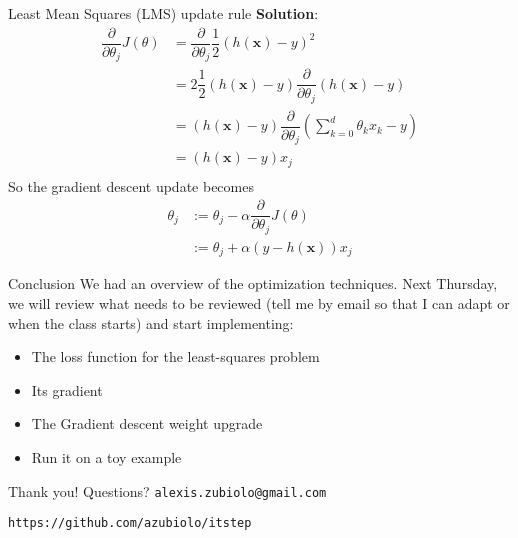 \documentclass{beamer}
\newcommand{\bx}{\bm{x}}
\newcommand{\1}[1]{\mathbbm{1}\left[#1\right]}
\begin{document}
\begin{frame}{Least Mean Squares (LMS) update rule}
\textbf{Solution}: 
\begin{equation*}
\begin{split}
\dfrac{\partial}{\partial \theta_j} J(\theta) & = \dfrac{\partial}{\partial \theta_j} \dfrac{1}{2} \left( h\left(\bx\right) - y \right)^2 \\ 
 & = 2 \dfrac{1}{2} \left( h\left(\bx\right) - y \right) \dfrac{\partial}{\partial \theta_j}\left( h\left(\bx\right) - y \right)\\
 & = \left( h\left(\bx\right) - y \right) \dfrac{\partial}{\partial \theta_j}\left( \sum_{k = 0}^{d} \theta_k x_k - y \right)\\
 & = \left( h\left(\bx\right) - y \right) x_j\\
\end{split}
\end{equation*}
\pause
\vfill
So the gradient descent update becomes
\begin{equation*}
\begin{split}
\theta_j &:= \theta_j - \alpha \dfrac{\partial}{\partial \theta_j} J(\theta) \\
 & := \theta_j + \alpha \left( y - h\left(\bx\right)\right) x_j
\end{split}
\end{equation*}
\end{frame}

\begin{frame}{Conclusion}
We had an overview of the optimization techniques. 
\vfill
\pause
Next Thursday, we will review what needs to be reviewed (tell me by email so that I can adapt or when the class starts) and start implementing:
\begin{itemize}
	\item The loss function for the least-squares problem
	\item Its gradient
	\item The Gradient descent weight upgrade
	\item Run it on a toy example
\end{itemize}
\end{frame}

\begin{frame}
\vfill
\centering
\begin{huge}
\huge{Thank you! Questions?}
\vfill
\texttt{alexis.zubiolo@gmail.com}
\end{huge}
\vfill
\begin{Large}
\texttt{https://github.com/azubiolo/itstep}
\end{Large}
\vfill
\end{frame}
\end{document}

